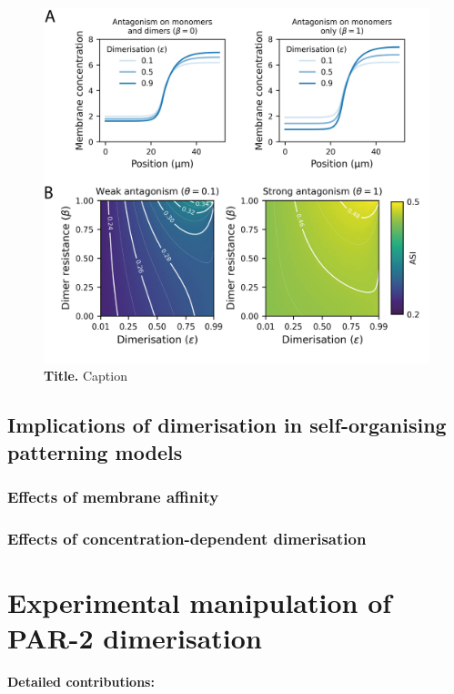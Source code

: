 \documentclass[12pt]{"report"}
\newcommand{\mycaption}[2]{\caption[#1]{\textbf{#1.} #2}}
\begin{document}
\begin{figure}
\includegraphics[scale=1]{model_fixed_apar_asi}
\centering
\mycaption{Title}{Caption}
\label{fig:model_fixed_apar_asi}
\end{figure}

\section{Implications of dimerisation in self-organising patterning models}

\subsection{Effects of membrane affinity}

\subsection{Effects of concentration-dependent dimerisation}


\clearpage
\chapter{Experimental manipulation of PAR-2 dimerisation}

\textbf{Detailed contributions:}\\
\end{document}
